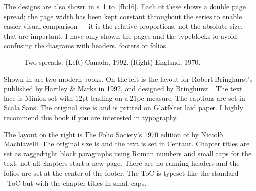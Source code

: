 \documentclass[10pt,a4paper,oneside,extrafontsizes]{memoir}%
\begin{document}
\begin{paracol}{2}
    The designs are also shown in \figurerefname s~\ref{fb:1} 
to~\ref{fb:16}. Each of these shows a double page spread; the 
page width has been kept constant throughout the series to enable easier
visual comparison --- it is the relative proportions, not the absolute size, 
that are important. I have only shown the pages and the typeblocks to avoid
confusing the diagrams with headers, footers 
or folios.
\end{paracol}

\begin{figure}
\centering
\begin{minipage}[b]{\pwlayi}
\end{minipage}
\hfill
\begin{minipage}[b]{\pwlayi}
\end{minipage}
\caption[Two spreads: Canada, 1992 and England, 1970]%
        {Two spreads: (Left) Canada, 1992. %
         (Right) England, 1970.} \label{fb:1}
\end{figure}

\begin{paracol}{2}
\switchEng
    Shown in  are two modern books. On the left is the layout
for Robert Bringhurst's 
 published
by Hartley \& Marks in 1992, and designed by Bringhurst~\autocite{BRINGHURST99}. 
The text face is
Minion set with $12$pt leading on a $21$pc measure. 
The captions are set in Scala Sans. The original
size is  and is printed on Glatfelter laid 
paper. 
I highly recommend this book if you are
interested in typography. 

The layout on the right is The Folio Society's
1970 edition of  by Niccol\`{o} Machiavelli. The original
size is  and the text is set in  
Centaur.
Chapter titles are set as raggedright block 
paragraphs using Roman numbers
and small caps for the text; not all chapters start a new page. There are
no running headers and the folios 
are set at the center of the footer.
The ToC is typeset like the standard \ltx\ ToC 
but with the chapter titles
in small caps.
\end{paracol}
\end{document}
